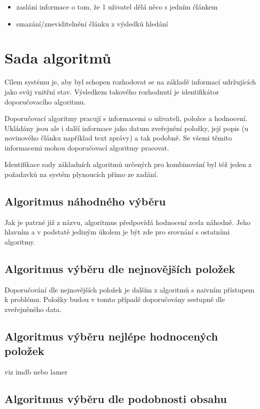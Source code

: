 \documentclass[thesis=M,czech]{FITthesis}[2014/05/07]
\begin{document}
\begin{itemize}
\item zaslání informace o tom, že 1 uživatel dělá něco s jedním článkem
	\item smazání/zneviditelnění článku z výsledků hledání
\end{itemize}
			
\section{Sada algoritmů}

Cílem systému je, aby byl schopen rozhodovat se na základě informací udržujících jako svůj vnitřní stav. Výsledkem takového rozhodnutí je identifikátor doporučovacího algoritmu. 

Doporučovací algoritmy pracují s informacemi o uživateli, položce a hodnocení. Ukládány jsou ale i další informace jako datum zveřejnění položky, její popis (u novinového článku například text zprávy) a tak podobně. Se všemi těmito informacemi mohou doporučovací algoritmy pracovat. 

Identifikace sady základních algoritmů určených pro kombinování byl též jeden z požadavků na systém plynoucích přímo ze zadání. 

\subsection{Algoritmus náhodného výběru}

Jak je patrné již z názvu, algoritmus předpovídá hodnocení zcela náhodně. Jeho hlavním a v podstatě jediným úkolem je být zde pro srovnání s ostatními algoritmy. 

\subsection{Algoritmus výběru dle nejnovějších položek}

Doporučování dle nejnovějších položek je dalším z algoritmů s naivním přístupem k problému. Položky budou v tomto případě doporučovány sestupně dle zveřejněného data.

\subsection{Algoritmus výběru nejlépe hodnocených položek}

viz imdb nebo lamer

\subsection{Algoritmus výběru dle podobnosti obsahu}
\end{document}
